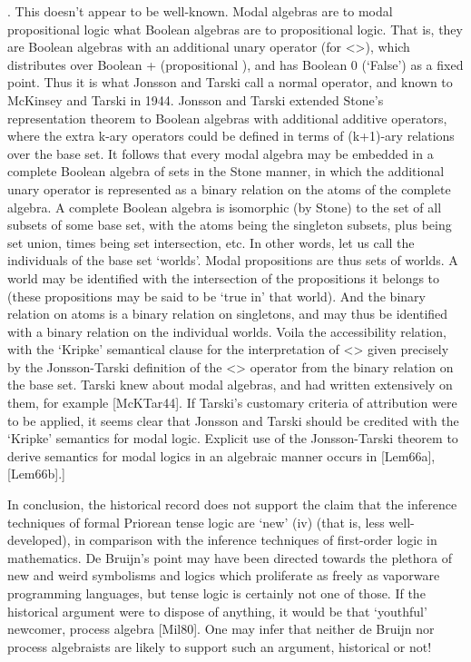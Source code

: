 \begin{spec}
[Historically, it turns out that Kripke's semantics follows directly
from the work of Jonsson and Tarski on Boolean algebras with
additional additive operators in 1951 [JonTar51].  This doesn't
appear to be well-known.  Modal algebras are to modal propositional
logic what Boolean algebras are to propositional logic. That is,
they are Boolean algebras with an additional unary operator (for
<>), which distributes over Boolean + (propositional \/), and has
Boolean 0 (`False') as a fixed point. Thus it is what Jonsson and
Tarski call a normal operator, and known to McKinsey and Tarski in
1944.  Jonsson and Tarski extended Stone's representation theorem to
Boolean algebras with additional additive operators, where the extra
k-ary operators could be defined in terms of (k+1)-ary relations
over the base set. It follows that every modal algebra may be
embedded in a complete Boolean algebra of sets in the Stone manner,
in which the additional unary operator is represented as a binary
relation on the atoms of the complete algebra. A complete Boolean
algebra is isomorphic (by Stone) to the set of all subsets of some
base set, with the atoms being the singleton subsets, plus being set
union, times being set intersection, etc.  In other words, let us
call the individuals of the base set `worlds'.  Modal propositions
are thus sets of worlds.  A world may be identified with the
intersection of the propositions it belongs to (these propositions
may be said to be `true in' that world). And the binary relation on
atoms is a binary relation on singletons, and may thus be identified
with a binary relation on the individual worlds. Voila the
accessibility relation, with the `Kripke' semantical clause for the
interpretation of <> given precisely by the Jonsson-Tarski
definition of the <> operator from the binary relation on the base
set. Tarski knew about modal algebras, and had written extensively
on them, for example [McKTar44].  If Tarski's customary criteria of
attribution were to be applied, it seems clear that Jonsson and
Tarski should be credited with the `Kripke' semantics for modal
logic. Explicit use of the Jonsson-Tarski theorem to derive
semantics for modal logics in an algebraic manner occurs in
[Lem66a], [Lem66b].]

In conclusion, the historical record does not support the claim that
the inference techniques of formal Priorean tense logic are `new'
(iv) (that is, less well-developed), in comparison with the
inference techniques of first-order logic in mathematics. De
Bruijn's point may have been directed towards the plethora of new
and weird symbolisms and logics which proliferate as freely as
vaporware programming languages, but tense logic is certainly not
one of those.  If the historical argument were to dispose of
anything, it would be that `youthful' newcomer, process algebra
[Mil80]. One may infer that neither de Bruijn nor process
algebraists are likely to support such an argument, historical or
not!


\end{spec}
